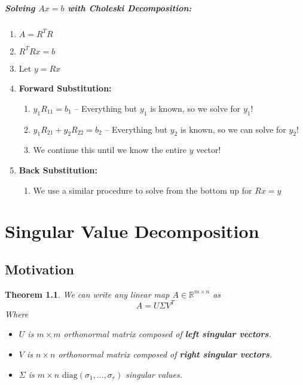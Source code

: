 \documentclass[a4paper,12pt]{report}
\def\reals{\mathbb{R}}
\newtheorem{theorem}{Theorem}
\begin{document}
\paragraph{Solving $Ax = b$ with Choleski Decomposition: } 
\begin{enumerate}
\item $A = R^TR$
\item $R^TRx = b$
\item Let $y = Rx$
\item \textbf{Forward Substitution: }
\begin{enumerate}
\item $y_1 R_{11} = b_1$ -- Everything but $y_1$ is known, so we solve for $y_1$!
\item $y_1 R_{21} + y_2 R_{22} = b_2$ -- Everything but $y_2$ is known, so we can solve for $y_2$!
\item We continue this until we know the entire $y$ vector!
\end{enumerate}
\item \textbf{Back Substitution: } 
\begin{enumerate}
\item We use a similar procedure to solve from the bottom up for $Rx = y$
\end{enumerate}
\end{enumerate}


\chapter{Singular Value Decomposition}

\section{Motivation}

\begin{theorem} 
We can write any linear map $A\in \reals^{m\times n}$ as 
\begin{equation}
	A = U\Sigma V^T
\end{equation}
Where 
\begin{itemize}
\item $U$ is $m\times m$ orthonormal matrix composed of \textbf{left singular vectors}.
\item $V$ is $n\times n$ orthonormal matrix composed of \textbf{right singular vectors}.
\item $\Sigma$ is $m\times n$ $\text{diag}(\sigma_1, ..., \sigma_r)$ singular values.
\end{itemize}
\end{theorem}
\end{document}
